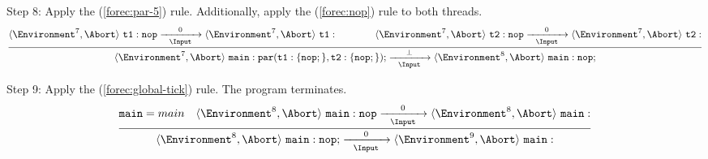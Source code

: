 \noindent
Step 8: Apply the (\ref{forec:par-5}) rule. Additionally, apply the (\ref{forec:nop}) 
rule to both threads.
\begin{equation*}
	\frac{
			\langle \Environment^7, \Abort \rangle ~ \mathtt{t1: nop}
				\xrightarrow[~~\Input~~]{0} 
			\langle \Environment^7, \Abort \rangle ~ \mathtt{t1: }
			\qquad
			\qquad
			\langle \Environment^7, \Abort \rangle ~ \mathtt{t2: nop}
				\xrightarrow[~~\Input~~]{0} 
			\langle \Environment^7, \Abort \rangle ~ \mathtt{t2: }
		}{
			\langle \Environment^7, \Abort \rangle ~ \mathtt{main: par( t1: \{nop;\}, t2:\{nop;\} );}
				\xrightarrow[~~\Input~~]{\bot} 
			\langle \Environment^8, \Abort \rangle ~ \mathtt{main: nop;}
		}
\end{equation*}

\noindent
Step 9: Apply the (\ref{forec:global-tick}) rule.
The program terminates.
\begin{equation*}
	\frac{
			\mathtt{main} = main
			\quad
			\langle \Environment^8, \Abort \rangle ~ \mathtt{main: nop}
				\xrightarrow[~~\Input~~]{0} 
			\langle \Environment^8, \Abort \rangle ~ \mathtt{main: }
		}{
			\langle \Environment^8, \Abort \rangle ~ \mathtt{main: nop;}
				\xrightarrow[~~\Input~~]{0} 
			\langle \Environment^9, \Abort \rangle ~ \mathtt{main: }
		}
\end{equation*}

